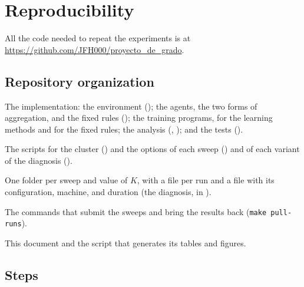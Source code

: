 \chapter{Reproducibility}
\label{apx:reproducibility}

All the code needed to repeat the experiments is at \url{https://github.com/JFH000/proyecto_de_grado}.


\section{Repository organization}

\begin{description}[nosep, itemsep=2pt]
  \item[\path{v2v/}] The implementation: the environment (); the agents, the two forms of
    aggregation, and the fixed rules (); the training programs,  for the learning
    methods and  for the fixed rules; the analysis (,
    ); and the tests ().
  \item[\path{v2v/jobs/}] The scripts for the cluster () and the options of each sweep
    () and of each variant of the diagnosis ().
  \item[\path{v2v/runs/}] One folder per sweep and value of $K$, with a  file per run and a
     file with its configuration, machine, and duration (the diagnosis, in ).
  \item[\path{Makefile}] The commands that submit the sweeps and bring the results back
    (\texttt{make pull-runs}).
  \item[\path{thesis-template/}] This document and the script that generates its tables and figures.
\end{description}

\section{Steps}

